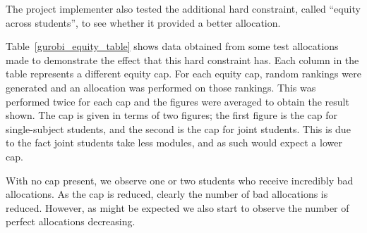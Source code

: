 The project implementer also tested the additional hard constraint, called
``equity across students'', to see whether it provided a better allocation.

Table~\ref{gurobi_equity_table} shows data obtained from some test allocations
made to demonstrate the effect that this hard constraint has. Each column in
the table represents a different equity cap. For each equity cap, random
rankings were generated and an allocation was performed on those rankings.
This was performed twice for each cap and the figures were averaged to obtain
the result shown. The cap is given in terms of two figures; the first figure
is the cap for single-subject students, and the second is the cap for joint
students. This is due to the fact joint students take less modules, and as
such would expect a lower cap.

With no cap present, we observe one or two students who receive incredibly bad
allocations. As the cap is reduced, clearly the number of bad allocations is
reduced. However, as might be expected we also start to observe the number of
perfect allocations decreasing.
